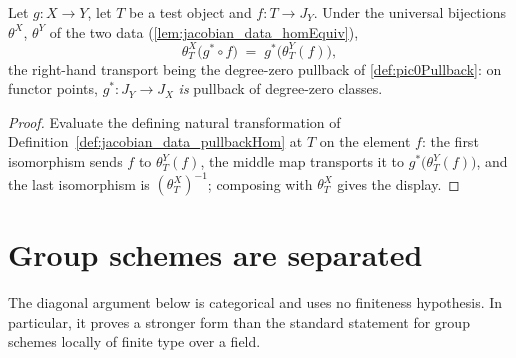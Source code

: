 \begin{lemma}
  \label{lem:jacobian_data_comp_pullbackHom}
  \leanok
  Let \(g \colon X \to Y\), let \(T\) be a test object and \(f \colon T \to
  J_Y\). Under the universal bijections \(\theta^X\), \(\theta^Y\) of the two
  data (\ref{lem:jacobian_data_homEquiv}),
  \[
    \theta^X_T\bigl(g^{*} \circ f\bigr)
      \;=\; g^{*}\bigl(\theta^Y_T(f)\bigr),
  \]
  the right-hand transport being the degree-zero pullback of
  \ref{def:pic0Pullback}: on functor points, \(g^{*} \colon J_Y \to J_X\)
  \emph{is} pullback of degree-zero classes.
\end{lemma}
\begin{proof}
  \leanok
  Evaluate the defining natural transformation of
  Definition~\ref{def:jacobian_data_pullbackHom} at \(T\) on the element
  \(f\): the first isomorphism sends \(f\) to \(\theta^Y_T(f)\), the middle
  map transports it to \(g^{*}\bigl(\theta^Y_T(f)\bigr)\), and the last
  isomorphism is \((\theta^X_T)^{-1}\); composing with \(\theta^X_T\) gives
  the display.
\end{proof}

\section{Group schemes are separated}
\label{sec:group_separated}

The diagonal argument below is categorical and uses no finiteness hypothesis.
In particular, it proves a stronger form than the standard statement for group
schemes locally of finite type over a field.


